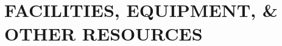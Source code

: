 \documentclass[../preamble.tex]{subfiles}
\begin{document}
\section{FACILITIES, EQUIPMENT, \& OTHER RESOURCES}

\end{document}
